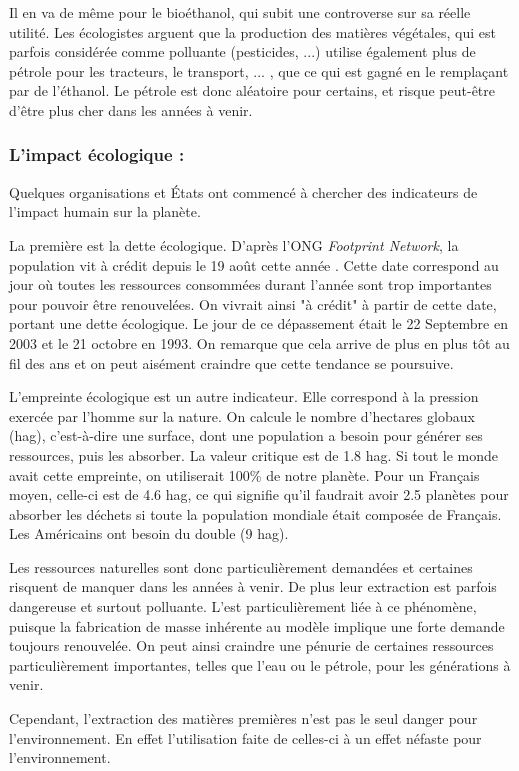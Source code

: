 Il en va de même pour le bioéthanol, qui subit une controverse sur sa réelle utilité. Les écologistes arguent que la production des matières végétales, qui est parfois considérée comme polluante (pesticides, ...) utilise également plus de pétrole pour les tracteurs, le transport, ... , que ce qui est gagné en le remplaçant par de l’éthanol. Le pétrole est donc aléatoire pour certains, et risque peut-être d'être plus cher dans les années à venir.


\subsubsection{L'impact écologique : } 

Quelques organisations et États ont commencé à chercher des indicateurs de l'impact humain sur la planète.

La première est la dette écologique. D'après l'ONG \textit{Footprint Network}, la population vit à crédit depuis le 19 août cette année \cite{DateACredit}. Cette date correspond au jour où toutes les ressources consommées durant l'année sont trop importantes pour pouvoir être renouvelées. On vivrait ainsi "à crédit" à partir de cette date, portant une dette écologique. Le jour de ce dépassement était le 22 Septembre en 2003 et le 21 octobre en 1993. On remarque que cela arrive de plus en plus tôt au fil des ans et on peut aisément craindre que cette tendance se poursuive.

L'empreinte écologique est un autre indicateur. Elle correspond à la pression exercée par l'homme sur la nature. On calcule le nombre d'hectares globaux (hag), c'est-à-dire une surface, dont une population a besoin pour générer ses ressources, puis les absorber. La valeur critique est de 1.8 hag. Si tout le monde avait cette empreinte, on utiliserait 100\% de notre planète. Pour un Français moyen, celle-ci est de 4.6 hag, ce qui signifie qu'il faudrait avoir 2.5 planètes pour absorber les déchets si toute la population mondiale était composée de Français. Les Américains ont besoin du double (9 hag).

\bigbreak
Les ressources naturelles sont donc particulièrement demandées et certaines risquent de manquer dans les années à venir. De plus leur extraction est parfois dangereuse et surtout polluante. L'\op est particulièrement liée à ce phénomène, puisque la fabrication de masse inhérente au modèle implique une forte demande toujours renouvelée. On peut ainsi craindre une pénurie de certaines ressources particulièrement importantes, telles que l'eau ou le pétrole, pour les générations à venir.

\medbreak
Cependant, l'extraction des matières premières n'est pas le seul danger pour l'environnement. En effet l'utilisation faite de celles-ci à un effet néfaste pour l'environnement.






